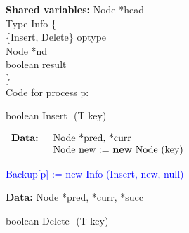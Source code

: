 \begin{figure}[h]
	\vspace{-10mm}
	
	\footnotesize
	
	\textbf{Shared variables:} Node *head \\
	
	Type Info \{  \\
		\hspace*{6mm} \{Insert, Delete\} optype \\
		\hspace*{6mm} Node *nd \\
		\hspace*{6mm} boolean result \\
	\} \\
	
	Code for process p:
	
	\begin{procedure}[H]
		\caption{boolean Insert $ $ (T key)}
		
		$ \begin{array}{rl}
			\mbox{\textbf{Data: }}	&	\mbox{Node *pred, *curr} \\
							&	\mbox{Node new := \textbf{new} Node (key)}
		\end{array} $
		
		\textcolor{blue} {Backup[p] := new Info (Insert, new, null)} \;
		
	\end{procedure}
	
	
	\begin{procedure}[H]
		\caption{boolean Delete $ $ (T key)}
		
		\textbf{Data: } Node *pred, *curr, *succ
		

\end{procedure}
\end{figure}
